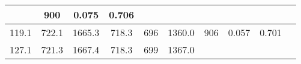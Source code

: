 \documentclass[a4paper,10pt]{article}
\begin{document}
\begin{longtable}{
     |
%    
    c|
%    
    c|
%    
    c|
%    
    c|
%    
    c|
%    
    c|
%    
    c|
%    
    c|
%    
    c|
%    
    c|
%    
    }
%        
        & 900
%        

%        

%        
        & 0.075
%        

%        

%        
        & 0.706
%        

%        
        \\
        \hline

        

%        

%        
        119.1
%        

%        

%        
        & 722.1
%        

%        

%        
        & 1665.3
%        

%        

%        
        & 718.3
%        

%        

%        
        & 696
%        

%        

%        
        & 1360.0
%        

%        

%        
        & 906
%        

%        

%        
        & 0.057
%        

%        

%        
        & 0.701
%        

%        
        \\
        \hline

        

%        

%        
        127.1
%        

%        

%        
        & 721.3
%        

%        

%        
        & 1667.4
%        

%        

%        
        & 718.3
%        

%        

%        
        & 699
%        

%        

%        
        & 1367.0
%        

%        


\end{longtable}
\end{document}
